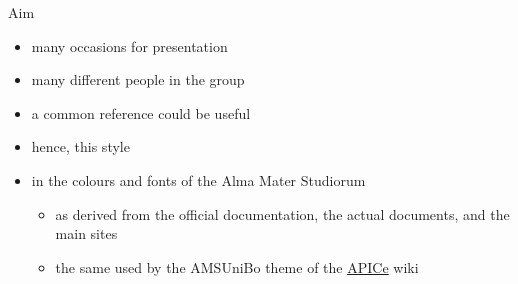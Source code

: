 \begin{frame}[c]{Aim}
%
\begin{itemize}
	\item many occasions for presentation
	\item many different people in the group
	\item a common reference could be useful
	\item hence, this style
	\item in the colours and fonts of the Alma Mater Studiorum
	\begin{itemize}
		\item as derived from the official documentation, the actual documents, and the main sites
		\item the same used by the \alert{AMSUniBo} theme of the \href{https://apice.unibo.it/}{\textsf{APICe}} wiki
	\end{itemize}
\end{itemize}
%
\end{frame}
